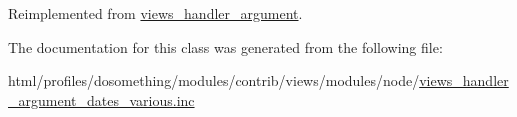 Reimplemented from \hyperlink{classviews__handler__argument_a76181ac24e7be4a09aaafc1fa5f15ea1}{views\_\-handler\_\-argument}.

The documentation for this class was generated from the following file:\begin{DoxyCompactItemize}
\item 
html/profiles/dosomething/modules/contrib/views/modules/node/\hyperlink{views__handler__argument__dates__various_8inc}{views\_\-handler\_\-argument\_\-dates\_\-various.inc}\end{DoxyCompactItemize}
